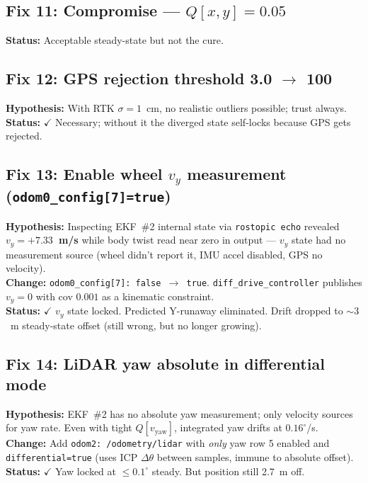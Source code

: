 \documentclass[11pt,a4paper]{article}
\newcommand{\good}[1]{\textcolor{good}{\textbf{#1}}}
\newcommand{\bad}[1]{\textcolor{bad}{\textbf{#1}}}
\begin{document}
\subsection{Fix 11: Compromise --- $Q[x,y] = 0.05$}
\textbf{Status:} Acceptable steady-state but not the cure.

\subsection{Fix 12: GPS rejection threshold 3.0 $\to$ 100}
\textbf{Hypothesis:} With RTK $\sigma=1$~cm, no realistic outliers possible; trust always.\\
\textbf{Status:} \good{$\checkmark$} Necessary; without it the diverged state self-locks because GPS gets rejected.

\subsection{Fix 13: Enable wheel $v_y$ measurement (\texttt{odom0\_config[7]=true})}
\textbf{Hypothesis:} Inspecting EKF~\#2 internal state via \texttt{rostopic echo} revealed
\bad{$v_y = +7.33$~m/s} while body twist read near zero in output --- $v_y$ state had no measurement source
(wheel didn't report it, IMU accel disabled, GPS no velocity).\\
\textbf{Change:} \texttt{odom0\_config[7]: false $\to$ true}. \texttt{diff\_drive\_controller} publishes
$v_y\!=\!0$ with cov $0.001$ as a kinematic constraint.\\
\textbf{Status:} \good{$\checkmark$} $v_y$ state locked. Predicted Y-runaway eliminated.
Drift dropped to $\sim\!\!3$~m steady-state offset (still wrong, but no longer growing).

\subsection{Fix 14: LiDAR yaw absolute in differential mode}
\textbf{Hypothesis:} EKF~\#2 has no absolute yaw measurement; only velocity sources for yaw rate.
Even with tight $Q[v_{\mathrm{yaw}}]$, integrated yaw drifts at $0.16^\circ$/s.\\
\textbf{Change:} Add \texttt{odom2: /odometry/lidar} with \emph{only} yaw row 5 enabled and
\texttt{differential=true} (uses ICP $\Delta\theta$ between samples, immune to absolute offset).\\
\textbf{Status:} \good{$\checkmark$} Yaw locked at $\le\!0.1^\circ$ steady. But position still 2.7~m off.
\end{document}
